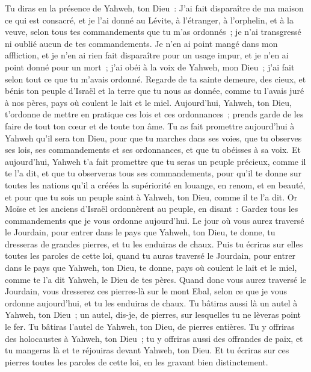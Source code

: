\begin{multicols}{2}
Tu diras en la présence de Yahweh, ton Dieu~: J'ai fait disparaître de ma maison ce qui est consacré, et je l'ai donné au Lévite, à l'étranger, à l'orphelin, et à la veuve, selon tous tes commandements que tu m'as ordonnés~; je n'ai transgressé ni oublié aucun de tes commandements.
Je n'en ai point mangé dans mon affliction, et je n'en ai rien fait disparaître pour un usage impur, et je n'en ai point donné pour un mort~; j'ai obéi à la voix de Yahweh, mon Dieu~; j'ai fait selon tout ce que tu m'avais ordonné.
Regarde de ta sainte demeure, des cieux, et bénis ton peuple d'Israël et la terre que tu nous as donnée, comme tu l'avais juré à nos pères, pays où coulent le lait et le miel.
Aujourd'hui, Yahweh, ton Dieu, t'ordonne de mettre en pratique ces lois et ces ordonnances~; prends garde de les faire de tout ton cœur et de toute ton âme.
Tu as fait promettre aujourd'hui à Yahweh qu'il sera ton Dieu, pour que tu marches dans ses voies, que tu observes ses lois, ses commandements et ses ordonnances, et que tu obéisses à sa voix.
Et aujourd'hui, Yahweh t'a fait promettre que tu seras un peuple précieux, comme il te l'a dit, et que tu observeras tous ses commandements,
pour qu'il te donne sur toutes les nations qu'il a créées la supériorité en louange, en renom, et en beauté, et pour que tu sois un peuple saint à Yahweh, ton Dieu, comme il te l'a dit.
\VerseOne{}Or Moïse et les anciens d'Israël ordonnèrent au peuple, en disant~: Gardez tous les commandements que je vous ordonne aujourd'hui.
Le jour où vous aurez traversé le Jourdain, pour entrer dans le pays que Yahweh, ton Dieu, te donne, tu dresseras de grandes pierres, et tu les enduiras de chaux.
Puis tu écriras sur elles toutes les paroles de cette loi, quand tu auras traversé le Jourdain, pour entrer dans le pays que Yahweh, ton Dieu, te donne, pays où coulent le lait et le miel, comme te l'a dit Yahweh, le Dieu de tes pères.
Quand donc vous aurez traversé le Jourdain, vous dresserez ces pierres-là sur le mont Ebal, selon ce que je vous ordonne aujourd'hui, et tu les enduiras de chaux.
Tu bâtiras aussi là un autel à Yahweh, ton Dieu~; un autel, dis-je, de pierres, sur lesquelles tu ne lèveras point le fer.
Tu bâtiras l'autel de Yahweh, ton Dieu, de pierres entières. Tu y offriras des holocaustes à Yahweh, ton Dieu~;
tu y offriras aussi des offrandes de paix, et tu mangeras là et te réjouiras devant Yahweh, ton Dieu.
Et tu écriras sur ces pierres toutes les paroles de cette loi, en les gravant bien distinctement.

\end{multicols}
